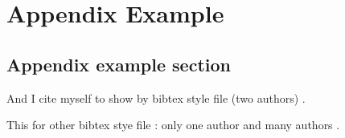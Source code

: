 \chapter{Appendix Example}
\label{chap:appendix1}

\section{Appendix example section}

And I cite myself to show by bibtex style file (two authors) \citep{Commowick_MICCAI_2007}.

This for other bibtex stye file : only one author \cite{Oakes_RStat_1999} and many authors \cite{Guimond_CVIU_2000}.